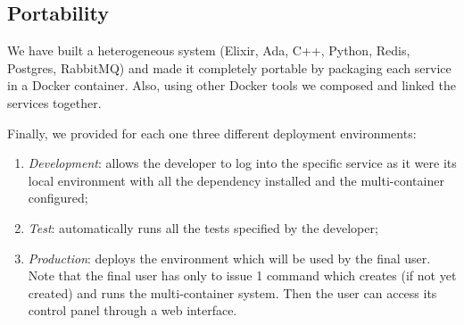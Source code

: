 \subsection{Portability}
We have built a heterogeneous system
(Elixir, Ada, C++, Python, Redis, Postgres, RabbitMQ)
and made it completely portable by packaging each service in a Docker
container.
Also, using other Docker tools we composed and linked the services together.

Finally, we provided for each one three different deployment environments:
\begin{enumerate}
  \item \textit{Development}: allows the developer to
    log into the specific service as it were its local environment
    with all the dependency installed and the multi-container configured;
  \item \textit{Test}: automatically runs all the tests specified by
    the developer;
  \item \textit{Production}: deploys the environment which will be used by
    the final user. Note that the final user has only to issue 1 command which
    creates (if not yet created) and runs the multi-container system.
    Then the user can access its control panel through a web interface.
\end{enumerate}
